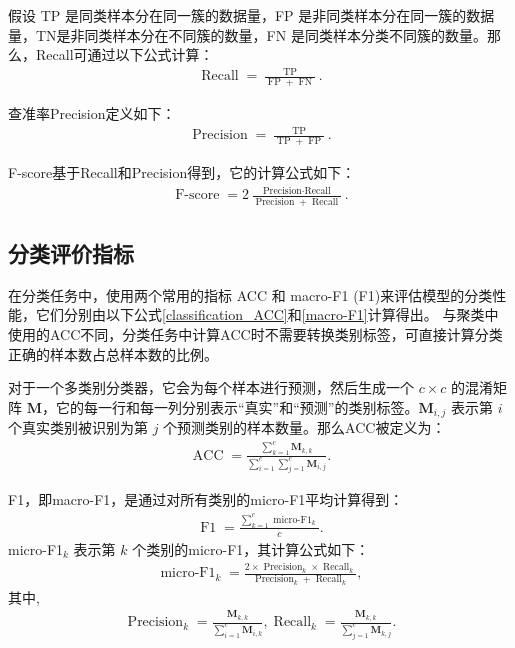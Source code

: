 假设 TP 是同类样本分在同一簇的数据量，FP 是非同类样本分在同一簇的数据量，TN是非同类样本分在不同簇的数量，FN 是同类样本分类不同簇的数量。那么，Recall可通过以下公式计算：
\begin{align}\label{Recall}
	\operatorname{Recall} = \frac{\operatorname{TP}}{\operatorname{FP}+\operatorname{FN}}.
\end{align}

查准率Precision定义如下：
\begin{align}\label{Precision}
	\operatorname{Precision} = \frac{\operatorname{TP}}{\operatorname{TP}+\operatorname{FP}}.
\end{align}

F-score基于Recall和Precision得到，它的计算公式如下：
\begin{align}\label{F-score}
	\operatorname{F-score} = 2 \frac{\operatorname{Precision\cdot \operatorname{Recall}}}{\operatorname{Precision} + \operatorname{Recall}}.
\end{align}

\subsection{分类评价指标}\label{classification_metrics}
在分类任务中，使用两个常用的指标 ACC 和 macro-F1 (F1)来评估模型的分类性能，它们分别由以下公式\eqref{classification_ACC}和\eqref{macro-F1}计算得出。
与聚类中使用的ACC不同，分类任务中计算ACC时不需要转换类别标签，可直接计算分类正确的样本数占总样本数的比例。

对于一个多类别分类器，它会为每个样本进行预测，然后生成一个 $c \times c$ 的混淆矩阵  $\mathbf{M}$，它的每一行和每一列分别表示“真实”和“预测”的类别标签。$\mathbf{M}_{i,j}$ 表示第 $i$ 个真实类别被识别为第 $j$ 个预测类别的样本数量。那么ACC被定义为：
\begin{align}\label{classification_ACC}
	\operatorname{ACC} = \frac{\sum_{k=1}^c{\mathbf{M}_{k,k}}}{\sum_{i=1}^c{\sum_{j=1}^c{\mathbf{M}_{i,j}}}}.
\end{align}

F1，即macro-F1，是通过对所有类别的micro-F1平均计算得到：
\begin{align}\label{macro-F1}
	\operatorname{F1} = \frac{\sum_{k=1}^c \operatorname{micro-F1}_k}{c}.
\end{align}
micro-F1$_k$ 表示第 $k$ 个类别的micro-F1，其计算公式如下：
\begin{align}\label{micro-F1}
	\operatorname{micro-F1}_k = \frac{2\times\operatorname{Precision}_k\times\operatorname{Recall}_k}{\operatorname{Precision}_k + \operatorname{Recall}_k},
\end{align}
其中,
\begin{align}\label{precision_k}
	\operatorname{Precision}_k = \frac{\mathbf{M}_{k,k}}{\sum_{i=1}^c{\mathbf{M}_{i,k}}},
	\operatorname{Recall}_k = \frac{\mathbf{M}_{k,k}}{\sum_{j=1}^c{\mathbf{M}_{k,j}}}.
\end{align}